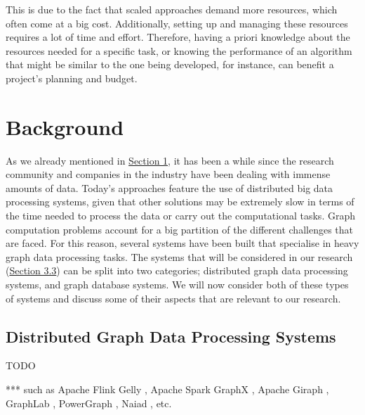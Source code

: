 \documentclass[a4paper,11pt]{article}
\begin{document}
\medskip

\par This is due to the fact that scaled approaches demand more resources, which often come at a big cost. Additionally, setting up and managing these resources requires a lot of time and effort. Therefore, having a priori knowledge about the resources needed for a specific task, or knowing the performance of an algorithm that might be similar to the one being developed, for instance, can benefit a project's planning and budget.





\section{Background} \label{background}

\par As we already mentioned in \hyperref[introduction]{Section 1}, it has been a while since the research community and companies in the industry have been dealing with immense amounts of data. Today's approaches feature the use of distributed big data processing systems, given that other solutions may be extremely slow in terms of the time needed to process the data or carry out the computational tasks. Graph computation problems account for a big partition of the different challenges that are faced. For this reason, several systems have been built that specialise in heavy graph data processing tasks. The systems that will be considered in our research (\hyperref[graph-proc]{Section 3.3}) can be split into two categories; distributed graph data processing systems, and graph database systems. We will now consider both of these types of systems and discuss some of their aspects that are relevant to our research.

\subsection{Distributed Graph Data Processing Systems}

TODO

***
such as Apache Flink Gelly \cite{flink}, Apache Spark GraphX \cite{spark,graphxpaper}, Apache Giraph \cite{giraph}, GraphLab \cite{graphlab}, PowerGraph \cite{powergraph}, Naiad \cite{naiad}, etc. 
\end{document}
